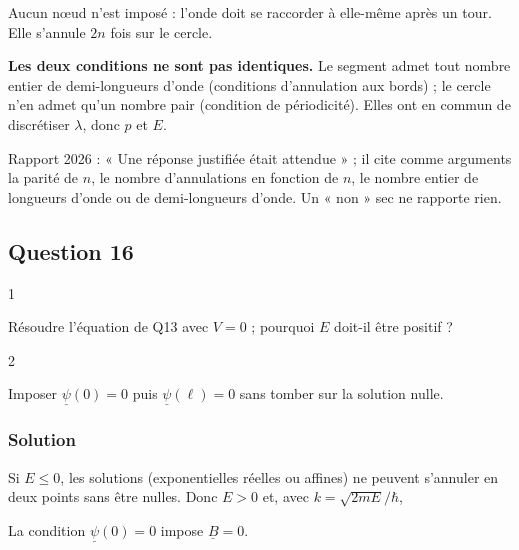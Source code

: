 \documentclass[11pt,a4paper]{article}
\renewcommand{\leq}{\leqslant}
\newcommand{\equationajustee}[1]{%
  \sbox{\boiteequation}{$\displaystyle #1$}%
  \ifdim\wd\boiteequation>\linewidth
    \[\resizebox{\linewidth}{!}{\usebox{\boiteequation}}\]%
  \else
    \[#1\]%
  \fi}
\begin{document}
Aucun nœud n'est imposé : l'onde doit se raccorder à elle-même après un tour. Elle s'annule \(2n\) fois sur le cercle.

\textbf{Les deux conditions ne sont pas identiques.} Le segment admet tout nombre entier de demi-longueurs d'onde (conditions d'annulation aux bords) ; le cercle n'en admet qu'un nombre pair (condition de périodicité). Elles ont en commun de discrétiser \(\lambda\), donc \(p\) et \(E\).

\begin{jury}

Rapport 2026 : « Une réponse justifiée était attendue » ; il cite comme arguments la parité de \(n\), le nombre d'annulations en fonction de \(n\), le nombre entier de longueurs d'onde ou de demi-longueurs d'onde. Un « non » sec ne rapporte rien.

\end{jury}

\hypertarget{question-16}{%
\subsection{Question 16}\label{question-16}}

\begin{indication}{1}

Résoudre l'équation de Q13 avec \(V=0\) ; pourquoi \(E\) doit-il être positif ?

\end{indication}

\begin{indication}{2}

Imposer \(\underline\psi(0)=0\) puis \(\underline\psi(\ell)=0\) sans tomber sur la solution nulle.

\end{indication}

\hypertarget{solution-15}{%
\subsubsection{Solution}\label{solution-15}}

Si \(E\leq0\), les solutions (exponentielles réelles ou affines) ne peuvent s'annuler en deux points sans être nulles. Donc \(E>0\) et, avec \(k=\sqrt{2mE}/\hbar\),

\equationajustee{\underline\psi=\underline A\sin(kx)+\underline B\cos(kx).}

La condition \(\underline\psi(0)=0\) impose \(\underline B=0\).
\end{document}
